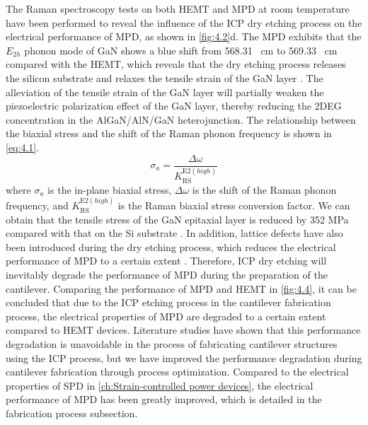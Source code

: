 The  Raman spectroscopy  tests on both HEMT  and MPD at room temperature have been performed to reveal the influence of the ICP dry etching  process on the electrical performance of MPD, as shown in \autoref{fig:4.2}d. The MPD exhibits that the $E_{2h}$ phonon mode of GaN shows a blue shift from 568.31 \unit{\per\cm} to 569.33 \unit{\per\cm} compared with the HEMT, which reveals that the dry etching process releases the silicon substrate and relaxes the tensile strain of the GaN layer \cite{yang2015influence,wang2016piezotronic}. The alleviation of the tensile strain of the GaN layer will partially weaken the piezoelectric polarization effect of the GaN layer, thereby reducing the 2DEG concentration  in the  AlGaN/AlN/GaN heterojunction. The relationship between the biaxial stress  and the shift of the Raman phonon frequency  is shown in \autoref{eq:4.1}. 
\begin{equation}
\sigma _{a}=\frac{\Delta \omega}{K_{\mathrm{RS}}^{\mathrm{E} 2(h i g h)}}
\label{eq:4.1}
\end{equation}
where $\sigma _{a}$ is the in-plane biaxial stress, $\Delta \omega$ is the shift of the Raman phonon frequency, and $K_{\mathrm{RS}}^{\mathrm{E} 2(h i g h)}$ is the Raman biaxial stress  conversion factor. We can obtain that the tensile stress of the GaN epitaxial layer is reduced by 352 \unit{\MPa} compared with that on the Si substrate \cite{choi2013analysis}. In addition, lattice defects have also been introduced during the dry etching process, which reduces the electrical performance of MPD to a certain extent \cite{ladroue2010deep,pearton2000review,huang2004inductively}. Therefore, ICP  dry etching  will inevitably degrade the performance of MPD during the preparation of the  cantilever. Comparing the performance of MPD and HEMT in \autoref{fig:4.4}, it can be concluded that due to the ICP etching process in the cantilever fabrication process, the electrical properties of MPD are degraded to a certain extent compared to HEMT devices. Literature studies have shown that this performance  degradation is unavoidable in the process of fabricating cantilever structures using the ICP process, but we have improved the performance degradation during cantilever fabrication through process optimization. Compared to the electrical properties of SPD  in \autoref{ch:Strain-controlled power devices}, the electrical performance of MPD has been greatly improved, which is detailed in the fabrication process subsection.

